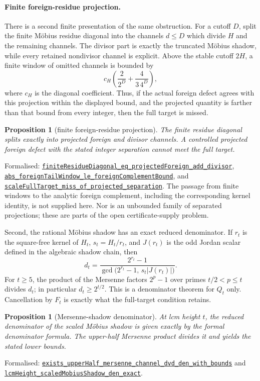 \documentclass[11pt]{article}
\newcommand{\commit}{81150c1c6fdd4cd51e76d3aa0de344341e0e9e7c}
\newcommand{\repobase}{https://github.com/wcook04/plectis-lean-erdos249-257/blob/\commit}
\newcommand{\PK}{Erdos249257}
\newcommand{\lref}[3]{\href{\repobase/\PK/#1\#L#2}{\nolinkurl{#3}}}
\newtheorem{proposition}[theorem]{Proposition}
\theoremstyle{definition}
\theoremstyle{remark}
\begin{document}
\paragraph{Finite foreign-residue projection.}  There is a second finite
presentation of the same obstruction.  For a cutoff $D$, split the finite
M\"obius residue diagonal into the channels $d\leq D$ which divide $H$ and
the remaining channels.  The divisor part is exactly the truncated M\"obius
shadow, while every retained nondivisor channel is explicit.  Above the
stable cutoff $2H$, a finite window of omitted channels is bounded by
\[
 c_H\left(\frac{2}{2^D}+\frac{4}{3\,4^D}\right),
\]
where $c_H$ is the diagonal coefficient.  Thus, if the actual foreign defect
agrees with this projection within the displayed bound, and the projected
quantity is farther than that bound from every integer, then the full target
is missed.

\begin{proposition}[finite foreign-residue projection]\label{res:foreignresidue}
The finite residue diagonal splits exactly into projected foreign and divisor
channels.  A controlled projected foreign defect with the stated integer
separation cannot meet the full target.
\end{proposition}
\noindent Formalised:
\lref{ActualForeignResidueProjection.lean}{307}{finiteResidueDiagonal_eq_projectedForeign_add_divisor},
\lref{ActualForeignResidueProjection.lean}{275}{abs_foreignTailWindow_le_foreignComplementBound},
and
\lref{ActualForeignResidueProjection.lean}{348}{scaleFullTarget_miss_of_projected_separation}.
The passage from finite windows to the analytic foreign complement, including
the corresponding kernel identity, is not supplied here.  Nor is an
unbounded family of separated projections; these are parts of the open
certificate-supply problem.

Second, the rational M\"obius shadow has an exact reduced denominator.  If
$r_t$ is the square-free kernel of $H_t$, $s_t=H_t/r_t$, and $J(r_t)$ is the
odd Jordan scalar defined in the algebraic shadow chain, then
\[
 d_t=
 \frac{2^{r_t}-1}
 {\gcd\!\bigl(2^{r_t}-1,\,s_t\lvert J(r_t)\rvert\bigr)}.
\]
For $t\geq5$, the product of the Mersenne factors $2^p-1$ over primes
$t/2<p\leq t$ divides $d_t$; in particular $d_t\geq2^{t/2}$.  This is a
denominator theorem for $Q_t$ only.  Cancellation by $F_t$ is exactly what the
full-target condition retains.

\begin{proposition}[Mersenne-shadow denominator]\label{res:shadowden}
At lcm height $t$, the reduced denominator of the scaled M\"obius shadow is
given exactly by the formal denominator formula.  The upper-half Mersenne
product divides it and yields the stated lower bounds.
\end{proposition}
\noindent Formalised:
\lref{MersenneShadowDenominatorGrowth.lean}{99}{exists_upperHalf_mersenne_channel_dvd_den_with_bounds}
and
\lref{MersenneShadowDenominatorGrowth.lean}{147}{lcmHeight_scaledMobiusShadow_den_exact}.
\end{document}

